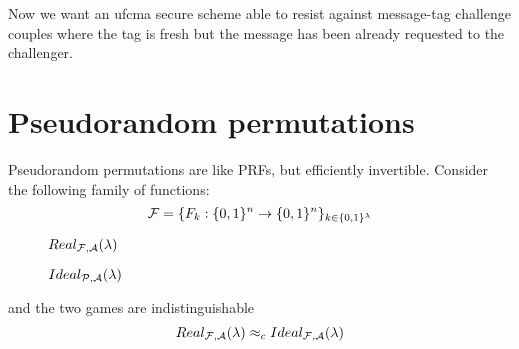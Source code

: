 Now we want an ufcma secure scheme able to resist against message-tag challenge
couples where the tag is fresh but the message has been already requested to the
challenger.\\
\section{Pseudorandom permutations}
Pseudorandom permutations are like PRFs, but efficiently invertible.
Consider the following family of functions:
\[
    \mathcal{F}=\{ F_{k} : \{0,1\}^{n} \to \{0,1\}^{n} \}_{k \in \{0,1\}^{\lambda} }
\]

\begin{figure}[h!]
   \centering
   \sdinit{}
   \caption{$Real_{\mathcal{F}, \mathcal{A}}(\lambda)$}
\end{figure}

\begin{figure}[h!]
   \centering
   \sdinit{}
   \caption{$Ideal_{\mathcal{P}, \mathcal{A}}(\lambda)$}
\end{figure}



and the two games are indistinguishable
\[
    Real_{\mathcal{F}, \mathcal{A}}(\lambda) \approx_{c} Ideal_{\mathcal{F}, \mathcal{A}}(\lambda)
\]
